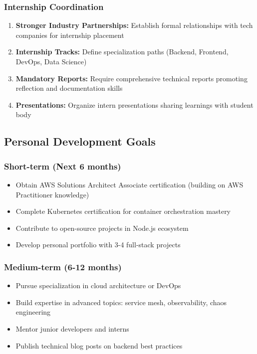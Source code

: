 \subsubsection{Internship Coordination}

\begin{enumerate}
    \item \textbf{Stronger Industry Partnerships:} Establish formal relationships with tech companies for internship placement
    
    \item \textbf{Internship Tracks:} Define specialization paths (Backend, Frontend, DevOps, Data Science)
    
    \item \textbf{Mandatory Reports:} Require comprehensive technical reports promoting reflection and documentation skills
    
    \item \textbf{Presentations:} Organize intern presentations sharing learnings with student body
\end{enumerate}

\subsection{Personal Development Goals}

\subsubsection{Short-term (Next 6 months)}

\begin{itemize}
    \item Obtain AWS Solutions Architect Associate certification (building on AWS Practitioner knowledge)
    \item Complete Kubernetes certification for container orchestration mastery
    \item Contribute to open-source projects in Node.js ecosystem
    \item Develop personal portfolio with 3-4 full-stack projects
\end{itemize}

\subsubsection{Medium-term (6-12 months)}

\begin{itemize}
    \item Pursue specialization in cloud architecture or DevOps
    \item Build expertise in advanced topics: service mesh, observability, chaos engineering
    \item Mentor junior developers and interns
    \item Publish technical blog posts on backend best practices
\end{itemize}

